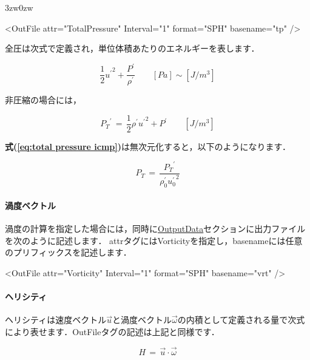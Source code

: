\begin{indentation}{3zw}{0zw}
{\small
\begin{program}
<OutFile attr="TotalPressure" Interval="1" format="SPH" basename="tp" />
\end{program}
}

全圧は次式で定義され，単位体積あたりのエネルギーを表します．

\begin{equation}
\frac{1}{2} {u^{\prime}}^{2} + \frac{P^{\prime}}{\rho^{\prime}} \qquad [Pa] \sim [J/m^3]
\label{eq:total pressure}
\end{equation}

非圧縮の場合には，

\begin{equation}
{P_{T}}^{\prime} \,=\, \frac{1}{2} \rho^{\prime} {u^{\prime}}^{2} + P^{\prime} \qquad [J/m^3]
\label{eq:total pressure icmp}
\end{equation}

\textbf{式(\ref{eq:total pressure icmp})}は無次元化すると，以下のようになります．

\begin{equation}
P_{T} \,=\, \frac{{P_{T}}^{\prime}}{\rho_{\mathit{0}}^{\prime} {u_{\mathit{0}}^{\prime}}^{2}}
\label{eq:total pressure icmp ND}
\end{equation}

%
\paragraph{渦度ベクトル}
渦度の計算を指定した場合には，同時に\hyperlink{tgt:output_data}{OutputData}セクションに出力ファイルを次のように記述します．
attrタグにはVorticityを指定し，basenameには任意のプリフィックスを記述します．

{\small
\begin{program}
<OutFile attr="Vorticity" Interval="1" format="SPH" basename="vrt" />
\end{program}
}

%
\paragraph{ヘリシティ}
ヘリシティは速度ベクトル$\overrightarrow{u}$と渦度ベクトル$\overrightarrow{\omega}$の内積として定義される量で次式により表せます．OutFileタグの記述は上記と同様です．

\begin{equation}
H \,=\, \overrightarrow{u} \cdot \overrightarrow{\omega}
\label{eq:helicity}
\end{equation}


\end{indentation}
